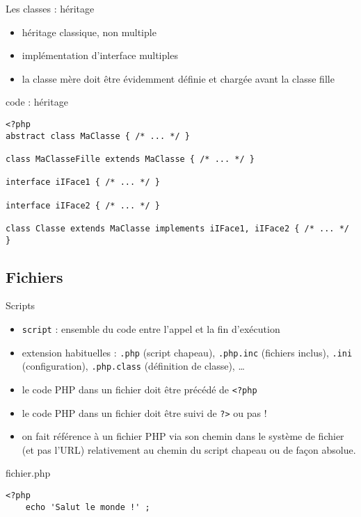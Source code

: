 \begin{frame}[containsverbatim]{Les classes : héritage}
	\begin{itemize}
		\item héritage classique, non multiple
		\item implémentation d'interface multiples
		\item la classe mère doit être évidemment définie et chargée avant la classe fille
	\end{itemize}
	\begin{block}{code : héritage}
		\begin{lstlisting}
<?php
abstract class MaClasse { /* ... */ }

class MaClasseFille extends MaClasse { /* ... */ }

interface iIFace1 { /* ... */ }

interface iIFace2 { /* ... */ }

class Classe extends MaClasse implements iIFace1, iIFace2 { /* ... */ } 
		\end{lstlisting}
	\end{block}
\end{frame}

\subsection{Fichiers}

\begin{frame}[containsverbatim]{Scripts}
	\begin{itemize}
		\item \texttt{script} : ensemble du code entre l'appel et la fin d'exécution
		\item extension habituelles : \texttt{.php} (script chapeau), \texttt{.php.inc} (fichiers inclus), \texttt{.ini} (configuration), \texttt{.php.class} (définition de classe), \ldots
		\item le code PHP dans un fichier doit être précédé de \texttt{<?php}
		\item le code PHP dans un fichier doit être suivi de \texttt{?>} ou pas !
		\item on fait référence à un fichier PHP via son chemin dans le système de fichier (et pas l'URL) relativement au chemin du script chapeau ou de façon absolue.
	\end{itemize}
	\begin{block}{fichier.php}
		\begin{lstlisting}
<?php
	echo 'Salut le monde !' ;
		\end{lstlisting}
	\end{block}
\end{frame}


